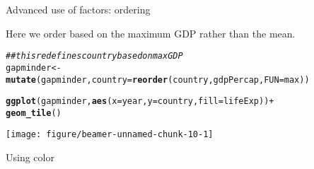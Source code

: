 \documentclass[table]{beamer}\usepackage[]{graphicx}\usepackage[]{color}
\makeatletter
\def\maxwidth{ %
  \ifdim\Gin@nat@width>\linewidth
    \linewidth
  \else
    \Gin@nat@width
  \fi
}
\newcommand{\hlcom}[1]{\textcolor[rgb]{0.678,0.584,0.686}{\textit{#1}}}%
\newcommand{\hlopt}[1]{\textcolor[rgb]{0,0,0}{#1}}%
\newcommand{\hlstd}[1]{\textcolor[rgb]{0.345,0.345,0.345}{#1}}%
\newcommand{\hlkwb}[1]{\textcolor[rgb]{0.69,0.353,0.396}{#1}}%
\newcommand{\hlkwc}[1]{\textcolor[rgb]{0.333,0.667,0.333}{#1}}%
\newcommand{\hlkwd}[1]{\textcolor[rgb]{0.737,0.353,0.396}{\textbf{#1}}}%
\newenvironment{kframe}{%
 \def\at@end@of@kframe{}%
 \ifinner\ifhmode%
  \def\at@end@of@kframe{\end{minipage}}%
  \begin{minipage}{\columnwidth}%
 \fi\fi%
 \def\FrameCommand##1{\hskip\@totalleftmargin \hskip-\fboxsep
 \colorbox{shadecolor}{##1}\hskip-\fboxsep
     \hskip-\linewidth \hskip-\@totalleftmargin \hskip\columnwidth}%
 \MakeFramed {\advance\hsize-\width
   \@totalleftmargin\z@ \linewidth\hsize
   \@setminipage}}%
 {\par\unskip\endMakeFramed%
 \at@end@of@kframe}
\newenvironment{knitrout}{}{} %
\makeatother
\begin{document}

\begin{frame}[fragile]{Advanced use of factors: ordering}

Here we order based on the maximum GDP rather than the mean.

\begin{knitrout}\tiny
{}\color{fgcolor}\begin{kframe}
\begin{alltt}
\hlcom{## this redefines country based on max GDP}
\hlstd{gapminder} \hlkwb{<-} \hlkwd{mutate}\hlstd{(gapminder,} \hlkwc{country} \hlstd{=} \hlkwd{reorder}\hlstd{(country, gdpPercap,} \hlkwc{FUN}\hlstd{=max))}

\hlkwd{ggplot}\hlstd{(gapminder,} \hlkwd{aes}\hlstd{(}\hlkwc{x}\hlstd{=year,} \hlkwc{y}\hlstd{=country,} \hlkwc{fill}\hlstd{=lifeExp))} \hlopt{+}
    \hlkwd{geom_tile}\hlstd{()}
\end{alltt}
\end{kframe}

{\centering \texttt{[image: figure/beamer-unnamed-chunk-10-1]} 

}


\end{knitrout}

\end{frame}



\begin{frame}[fragile]{}

\huge
\center
Using color

\end{frame}

\end{document}
